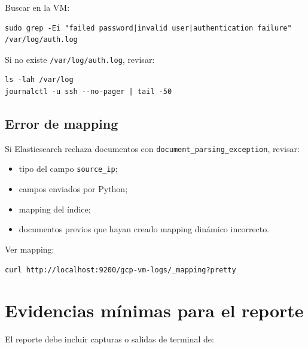 \documentclass[
  coursetitle={Cómputo Nube y Tecnologías Emergentes},
  coursehours={96},
  coursedate={Verano 2026},
  doctype={Práctica},
  otherlangs={english,french},
  authorname={Lázaro},
  authorsurname={Bustio-Martínez},
  authortitle={PhD},
  role={Profesor Investigador},
  email={lbustio@inaoe.mx},
  phone={5559504000},
  ext={7459},
  institution={Instituto Nacional de Astrofísica, Óptica y Electrónica (INAOE)},
  department={Maestría en Ciencias en Tecnologías de Seguridad},
  address={Luis Enrique Erro 1, Sta. Ma. Tonantzintla, San Andrés Cholula, CP 72840, Puebla, México},
  margin={0.5in}
]{../../lbustio_lecture_notes}
\begin{document}
Buscar en la VM:

\begin{lstlisting}
sudo grep -Ei "failed password|invalid user|authentication failure" /var/log/auth.log
\end{lstlisting}

Si no existe \texttt{/var/log/auth.log}, revisar:

\begin{lstlisting}
ls -lah /var/log
journalctl -u ssh --no-pager | tail -50
\end{lstlisting}

\subsection{Error de mapping}

Si Elasticsearch rechaza documentos con \texttt{document\_parsing\_exception}, revisar:

\begin{itemize}
    \item tipo del campo \texttt{source\_ip};
    \item campos enviados por Python;
    \item mapping del índice;
    \item documentos previos que hayan creado mapping dinámico incorrecto.
\end{itemize}

Ver mapping:

\begin{lstlisting}
curl http://localhost:9200/gcp-vm-logs/_mapping?pretty
\end{lstlisting}

\section{Evidencias mínimas para el reporte}

El reporte debe incluir capturas o salidas de terminal de:
\end{document}
